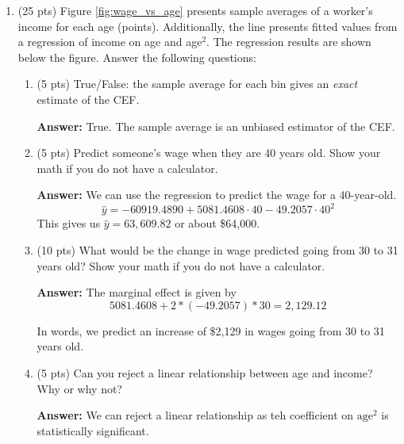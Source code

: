 \documentclass[12pt]{article}
\newcommand{\answer}[1]{{\color{blue_winged_teal}\textbf{Answer:} #1}}
\newcommand{\pts}[1]{{\color{zinc500}(#1 pts)}}
\begin{document}
\begin{enumerate}
  \answer{
    This is a bad idea because they are using the same data to train and to evaluate their model.
    They could be overfitting their model to the training data, which would make it perform worse on new data.
  }

  \bigskip
  \item \pts{25} Figure \ref{fig:wage_vs_age} presents sample averages of a worker's income for each age (points).
  Additionally, the line presents fitted values from a regression of income on age and age$^2$.
  The regression results are shown below the figure. Answer the following questions:

  \begin{enumerate}
    \item \pts{5} True/False: the sample average for each bin gives an \emph{exact} estimate of the CEF.

    \answer{
      True. The sample average is an unbiased estimator of the CEF.
    }

    \item \pts{5} Predict someone's wage when they are 40 years old. Show your math if you do not have a calculator.

    \answer{
      We can use the regression to predict the wage for a 40-year-old.
      $$
        \hat{y} = -60919.4890 + 5081.4608 \cdot 40 - 49.2057 \cdot 40^2
      $$
      This gives us $\hat{y} = 63,609.82$ or about \$64,000.
    }

    \item \pts{10} What would be the change in wage predicted going from 30 to 31 years old? Show your math if you do not have a calculator.

    \answer{
      The marginal effect is given by
      $$
        5081.4608 + 2 * (-49.2057) * 30 = 2,129.12
      $$

      In words, we predict an increase of \$2,129 in wages going from 30 to 31 years old.
    }

    \item \pts{5} Can you reject a linear relationship between age and income? Why or why not?

    \answer{
      We can reject a linear relationship as teh coefficient on $\text{age}^2$ is statistically significant.
    }
  \end{enumerate}


\end{enumerate}
\end{document}
